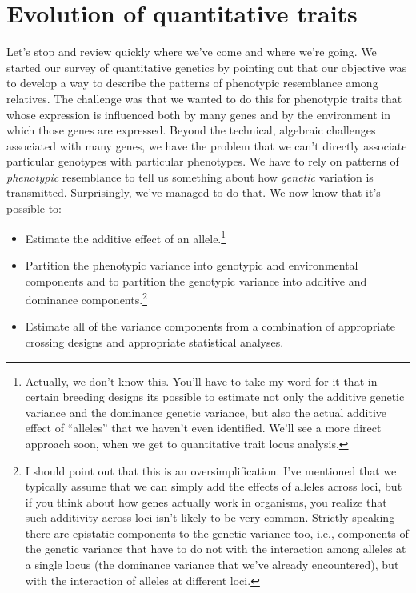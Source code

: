 \chapter{Evolution of quantitative traits}

Let's stop and review quickly where we've come and where we're
going. We started our survey of quantitative genetics by pointing out
that our objective was to develop a way to describe the patterns of
phenotypic resemblance among relatives. The challenge was that we
wanted to do this for phenotypic traits that whose expression is
influenced both by many genes and by the environment in which those
genes are expressed. Beyond the technical, algebraic challenges
associated with many genes, we have the problem that we can't directly
associate particular genotypes with particular phenotypes. We have to
rely on patterns of {\it phenotypic\/} resemblance to tell us
something about how {\it genetic\/} variation is
transmitted. Surprisingly, we've managed to do that. We now know that
it's possible to:

\begin{itemize}

\item Estimate the additive effect of an allele.\footnote{Actually, we
  don't know this. You'll have to take my word for it that in certain
  breeding designs its possible to estimate not only the additive
  genetic variance and the dominance genetic variance, but also the
  actual additive effect of ``alleles'' that we haven't even
  identified. We'll see a more direct approach soon, when we get to
  quantitative trait locus analysis.}

\item Partition the phenotypic variance into genotypic and
  environmental components and to partition the genotypic variance
  into additive and dominance components.\footnote{I should point out
    that this is an oversimplification. I've mentioned that we
    typically assume that we can simply add the effects of alleles
    across loci, but if you think about how genes actually work in
    organisms, you realize that such additivity across loci isn't
    likely to be very common. Strictly speaking there are epistatic
    components to the genetic variance too, i.e., components of the
    genetic variance that have to do not with the interaction among
    alleles at a single locus (the dominance variance that we've
    already encountered), but with the interaction of alleles at
    different loci.}

\item Estimate all of the variance components from a combination of
appropriate crossing designs and appropriate statistical analyses.

\end{itemize}

